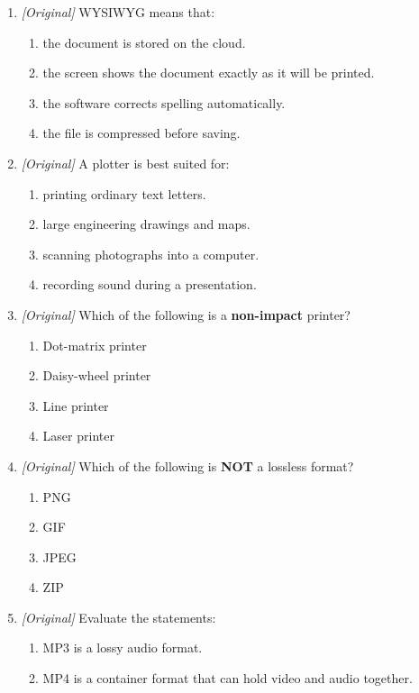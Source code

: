 \begin{enumerate}[label=\textbf{Q\arabic*.}, leftmargin=*]
\begin{enumerate}[label=\Alph*.]
    \item taskbar
    \item shortcut
  \end{enumerate}
\item \textit{[Original]} WYSIWYG means that:
  \begin{enumerate}[label=\Alph*.]
    \item the document is stored on the cloud.
    \item the screen shows the document exactly as it will be printed.
    \item the software corrects spelling automatically.
    \item the file is compressed before saving.
  \end{enumerate}
\item \textit{[Original]} A plotter is best suited for:
  \begin{enumerate}[label=\Alph*.]
    \item printing ordinary text letters.
    \item large engineering drawings and maps.
    \item scanning photographs into a computer.
    \item recording sound during a presentation.
  \end{enumerate}
\item \textit{[Original]} Which of the following is a \textbf{non-impact}
  printer?
  \begin{enumerate}[label=\Alph*.]
    \item Dot-matrix printer
    \item Daisy-wheel printer
    \item Line printer
    \item Laser printer
  \end{enumerate}
\item \textit{[Original]} Which of the following is \textbf{NOT} a lossless
  format?
  \begin{enumerate}[label=\Alph*.]
    \item PNG
    \item GIF
    \item JPEG
    \item ZIP
  \end{enumerate}
\item \textit{[Original]} Evaluate the statements:
  \begin{enumerate}[label=\Roman*.]
    \item MP3 is a lossy audio format.
    \item MP4 is a container format that can hold video and audio together.

\end{enumerate}
\end{enumerate}

